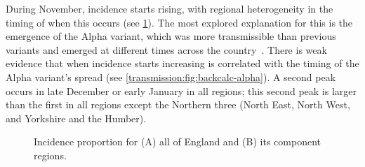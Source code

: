 \documentclass[thesis.tex]{subfiles}
\begin{document}
During November, incidence starts rising, with regional heterogeneity in the timing of when this occurs (see \cref{transmission:fig:backcalc-regions}).
The most explored explanation for this is the emergence of the Alpha variant, which was more transmissible than previous variants and emerged at different times across the country~\autocite{walkerTracking,daviesEstimated,lythgoeLineage}.
There is weak evidence that when incidence starts increasing is correlated with the timing of the Alpha variant's spread (see \cref{transmission:fig:backcalc-alpha}).
A second peak occurs in late December or early January in all regions; this second peak is larger than the first in all regions except the Northern three (North East, North West, and Yorkshire and the Humber).
\begin{figure}
    \caption[Incidence estimated using the phenomenological approach by region]{%
        Incidence proportion for (A) all of England and (B) its component regions.
    }
    \label{transmission:fig:backcalc-regions}
\end{figure}
\end{document}
